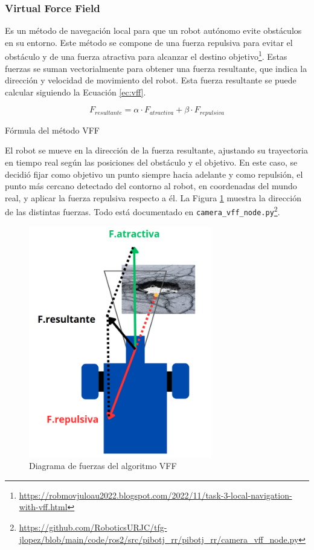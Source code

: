 \subsubsection{Virtual Force Field}
\label{subsubsec:vff}

Es un método de navegación local para que un robot autónomo evite obstáculos en su entorno. Este método se compone de una fuerza repulsiva para evitar el obstáculo y de una fuerza atractiva para alcanzar el destino objetivo\footnote{\url{https://robmovjuloau2022.blogspot.com/2022/11/task-3-local-navigation-with-vff.html}}. Estas fuerzas se suman vectorialmente para obtener una fuerza resultante, que indica la dirección y velocidad de movimiento del robot. Esta fuerza resultante se puede calcular siguiendo la Ecuación \ref{ec:vff}.

\begin{myequation}[h]
	\begin{equation}
		F_{resultante} = \alpha \cdot F_{atractiva} + \beta \cdot F_{repulsiva}
		\nonumber
	\end{equation}
	\caption[Fórmula del método VFF]{Fórmula del método VFF}
	\label{ec:vff}
\end{myequation} 

El robot se mueve en la dirección de la fuerza resultante, ajustando su trayectoria en tiempo real según las posiciones del obstáculo y el objetivo. En este caso, se decidió fijar como objetivo un punto siempre hacia adelante y como repulsión, el punto más cercano detectado del contorno al robot, en coordenadas del mundo real, y aplicar la fuerza repulsiva respecto a él. La Figura \ref{fig:vfffuerzas} muestra la dirección de las distintas fuerzas. Todo está documentado en \verb|camera_vff_node.py|\footnote{\url{https://github.com/RoboticsURJC/tfg-jlopez/blob/main/code/ros2/src/pibotj_rr/pibotj_rr/camera_vff_node.py}}.


 \begin{figure} [h!]
	\begin{center}
		\includegraphics[width=8cm]{figs/cap6/vff.png}
	\end{center}
	\caption{Diagrama de fuerzas del algoritmo VFF}
	\label{fig:vfffuerzas}
\end{figure}

